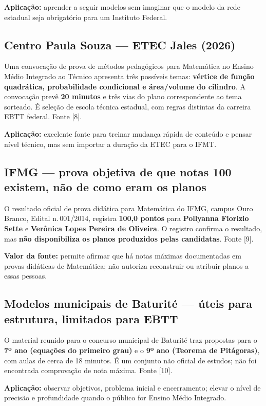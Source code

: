 \documentclass[11pt,a4paper]{article}
\begin{document}
\textbf{Aplicação:} aprender a seguir modelos sem imaginar que o modelo da rede estadual seja obrigatório para um Instituto Federal.

\subsection{Centro Paula Souza --- ETEC Jales (2026)}
Uma convocação de prova de métodos pedagógicos para Matemática no Ensino Médio Integrado ao Técnico apresenta três possíveis temas: \textbf{vértice de função quadrática, probabilidade condicional e área/volume do cilindro}. A convocação prevê \textbf{20 minutos} e três vias do plano correspondente ao tema sorteado. É seleção de escola técnica estadual, com regras distintas da carreira EBTT federal. Fonte [8].

\textbf{Aplicação:} excelente fonte para treinar mudança rápida de conteúdo e pensar nível técnico, mas sem importar a duração da ETEC para o IFMT.

\subsection{IFMG --- prova objetiva de que notas 100 existem, não de como eram os planos}
O resultado oficial de prova didática para Matemática do IFMG, campus Ouro Branco, Edital n.\,001/2014, registra \textbf{100,0 pontos} para \textbf{Pollyanna Fiorizio Sette} e \textbf{Verônica Lopes Pereira de Oliveira}. O registro confirma o resultado, mas \textbf{não disponibiliza os planos produzidos pelas candidatas}. Fonte [9].

\textbf{Valor da fonte:} permite afirmar que há notas máximas documentadas em provas didáticas de Matemática; não autoriza reconstruir ou atribuir planos a essas pessoas.

\subsection{Modelos municipais de Baturité --- úteis para estrutura, limitados para EBTT}
O material reunido para o concurso municipal de Baturité traz propostas para o \textbf{7º ano (equações do primeiro grau)} e o \textbf{9º ano (Teorema de Pitágoras)}, com aulas de cerca de 18 minutos. É um conjunto não oficial de estudos; não foi encontrada comprovação de nota máxima. Fonte [10].

\textbf{Aplicação:} observar objetivos, problema inicial e encerramento; elevar o nível de precisão e profundidade quando o público for Ensino Médio Integrado.
\end{document}
